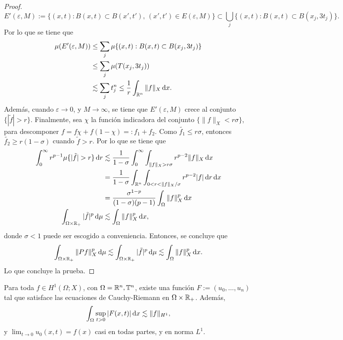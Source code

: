 \begin{proof}
	\begin{equation*}
		E'(\varepsilon, M) := \{(x, t) : B(x, t) \subset B(x', t'), \, (x', t') \in E(\varepsilon, M)\} \subset \bigcup_j \{(x, t): B(x, t)\subset B(x_j, 3t_j)\}.
	\end{equation*}
	Por lo que se tiene que 
	\begin{align*}
		\mu (E'(\varepsilon, M) ) & \leq \sum_j \mu \{(x, t): B(x, t)\subset B(x_j, 3t_j)\} \\
		& \leq \sum_j \mu (T(x_j, 3t_j)) \\
		& \lesssim \sum_j t_j^n 
		 \leq \frac{1}{r} \int_{\mathbb{R}^n} \|f\|_X\mathop{}\!\mathrm{d} x.
	\end{align*}
	Además, cuando $\varepsilon\to0$, y $M\to\infty$, se tiene que $E'(\varepsilon, M)$ crece al conjunto $\{|\tilde{f}|>r\} $. Finalmente, sea $\chi$ la función indicadora del conjunto $\{\|f\|_X<r\sigma\}$, para descomponer $f=f\chi + f(1-\chi)=:f_1+f_2$. Como $\tilde{f_1} \leq r\sigma$, entonces $\tilde{f_2} \geq r(1-\sigma)$ cuando $\tilde{f}>r$. Por lo que se tiene que
	\begin{align*}
		\int_0^\infty r^{p-1} \mu\{|\tilde{f}|>r\} \diff r & \lesssim \frac{1}{1-\sigma} \int_0^\infty \int_{\|f\|_X>r\sigma} r^{p-2} \|f\|_X \diff x \\
		& = \frac{1}{1-\sigma}\int_{\R^n}\int_{0<r<\|f\|_X/\sigma} r^{p-2}|f|\diff r \diff x \\
		& = \frac{\sigma^{1-p}}{(1-\sigma)(p-1)} \int_{\Omega}\|f\|_X^p \diff x \\
		\int_{\Omega\times\R_+} |\tilde{f}|^p \diff \mu & \lesssim \int_{\Omega}\|f\|_X^p \diff x,
	\end{align*}
	donde $\sigma<1$ puede ser escogido a conveniencia. Entonces, se concluye que 
	\begin{equation*}
		\int_{\Omega\times\mathbb{R}_+} \|Pf\|_X^p \mathop{}\!\mathrm{d} \mu\lesssim \int_{\Omega\times\mathbb{R}_+} |\tilde{f}|^p \mathop{}\!\mathrm{d} \mu \lesssim \int_{\Omega}\|f\|_X^p \mathop{}\!\mathrm{d} x.
	\end{equation*}
	Lo que concluye la prueba.
\end{proof}
\begin{theorem}\label{theo:H1-F}
	Para toda $f\in H^1(\Omega;X)$, con $\Omega =\mathbb{R}^n,\mathbb{T}^n$, existe una función $F:=(u_0, \ldots, u_n)$ tal que satisface las ecuaciones de Cauchy-Riemann en $\Omega\times\mathbb{R}_+$. Además, 
	\begin{equation*}
	\int_{\Omega} \sup_{t>0}  |F(x, t)| \mathop{}\!\mathrm{d} x \lesssim \|f\|_{H^1},
	\end{equation*}
	 y $\lim_{t\to0}u_0(x, t) = f(x)$ casi en todas partes, y  en norma $L^1$.
\end{theorem}
